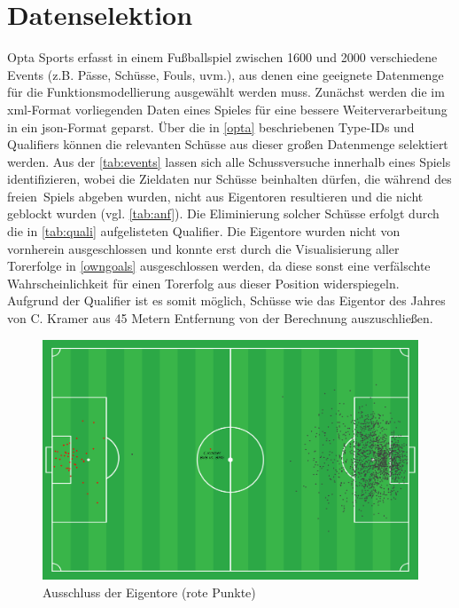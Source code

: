 \section{Datenselektion}
\label{ds}

Opta Sports erfasst in einem Fußballspiel zwischen 1600 und 2000 verschiedene Events (z.B. Pässe, Schüsse, Fouls, uvm.), aus denen eine geeignete Datenmenge für die Funktionsmodellierung ausgewählt werden muss. Zunächst werden die im \gls{xml}-Format vorliegenden Daten eines Spieles für eine bessere Weiterverarbeitung in ein \gls{json}-Format geparst. Über die in \vref{opta} beschriebenen \textsf{Type-IDs} und \textsf{Qualifiers} können die relevanten Schüsse aus dieser großen Datenmenge selektiert werden. Aus der \vref{tab:events} lassen sich alle Schussversuche innerhalb eines Spiels identifizieren, wobei die Zieldaten nur Schüsse beinhalten dürfen, die während des \glqq freien\grqq~Spiels abgeben wurden, nicht aus Eigentoren resultieren und die nicht geblockt wurden (vgl. \vref{tab:anf}). Die Eliminierung solcher Schüsse erfolgt durch die in \vref{tab:quali} aufgelisteten Qualifier. Die Eigentore wurden nicht von vornherein ausgeschlossen und konnte erst durch die Visualisierung aller Torerfolge in \vref{owngoals} ausgeschlossen werden, da diese sonst eine verfälschte Wahrscheinlichkeit für einen Torerfolg aus dieser Position widerspiegeln.\enlargethispage{2\baselineskip} Aufgrund der Qualifier ist es somit möglich, Schüsse wie das \glqq Eigentor des Jahres\grqq{} von C. Kramer aus 45 Metern Entfernung von der Berechnung auszuschließen.

\begin{figure}
\centering
\includegraphics[scale=0.4]{se-wa-jpg/owngoals}
\caption[Ausschluss der Eigentore]{Ausschluss der Eigentore (rote Punkte) }
\label{owngoals}
\end{figure}

